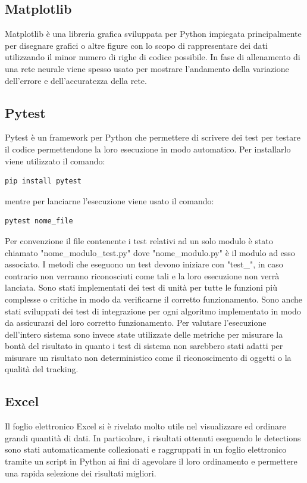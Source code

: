 \subsection{Matplotlib}
Matplotlib\cite{matplotlib} è una libreria grafica sviluppata per Python impiegata principalmente per disegnare grafici o altre figure con lo scopo di rappresentare dei dati utilizzando il minor numero di righe di codice possibile. In fase di allenamento di una rete neurale viene spesso usato per mostrare l'andamento della variazione dell'errore e dell'accuratezza della rete.
\subsection{Pytest}
Pytest\cite{pytest} è un framework per Python che permettere di scrivere dei test per testare il codice permettendone la loro esecuzione in modo automatico. Per installarlo viene utilizzato il comando:
\begin{verbatim}
pip install pytest
\end{verbatim}
mentre per lanciarne l'esecuzione viene usato il comando:
\begin{verbatim}
pytest nome_file
\end{verbatim}
Per convenzione il file contenente i test relativi ad un solo modulo è stato chiamato "nome\_modulo\_test.py" dove "nome\_modulo.py" è il modulo ad esso associato. I metodi che eseguono un test devono iniziare con "test\_", in caso contrario non verranno riconosciuti come tali e la loro esecuzione non verrà lanciata. Sono stati implementati dei test di unità per tutte le funzioni più complesse o critiche in modo da verificarne il corretto funzionamento. Sono anche stati sviluppati dei test di integrazione per ogni algoritmo implementato in modo da assicurarsi del loro corretto funzionamento. Per valutare l'esecuzione dell'intero sistema sono invece state utilizzate delle metriche per misurare la bontà del risultato in quanto i test di sistema non sarebbero stati adatti per misurare un risultato non deterministico come il riconoscimento di oggetti o la qualità del tracking.
\subsection{Excel}
Il foglio elettronico Excel si è rivelato molto utile nel visualizzare ed ordinare grandi quantità di dati. In particolare, i risultati ottenuti eseguendo le detections sono stati automaticamente collezionati e raggruppati in un foglio elettronico tramite un script in Python ai fini di agevolare il loro ordinamento e permettere una rapida selezione dei risultati migliori.
